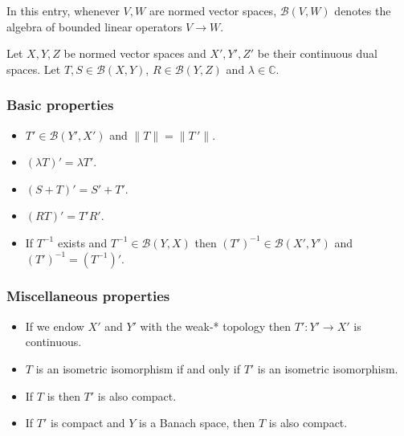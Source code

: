 \documentclass[12pt]{article}
\begin{document}

In this entry, whenever $V,W$ are normed vector spaces, $\mathcal{B}(V,W)$ denotes the algebra of bounded linear operators $V \longrightarrow W$.

Let $X, Y, Z$ be normed vector spaces and $X', Y', Z'$ be their continuous dual spaces. Let $T, S \in \mathcal{B}(X,Y)$, 
$R \in \mathcal{B}(Y,Z)$ and $\lambda \in \mathbb{C}$.

\subsubsection{Basic properties}
\begin{itemize}
\item $T' \in \mathcal{B}(Y',X')$ and $\|T\|=\|T\,'\|$.
\item $(\lambda T)' = \lambda T'$.
\item $(S+T)' = S'+T'$.
\item $(RT)' = T'R'$.
\item If $T^{-1}$ exists and $T^{-1} \in \mathcal{B}(Y,X)$ then $(T')^{-1} \in \mathcal{B}(X',Y')$ and $(T')^{-1} = (T^{-1})'$.
\end{itemize}

\subsubsection{Miscellaneous properties}
\begin{itemize}
\item If we endow $X'$ and $Y'$ with the weak-* topology then $T':Y' \longrightarrow X'$ is continuous.
\item $T$ is an isometric isomorphism if and only if $T'$ is an isometric isomorphism.
\item If $T$ is  then $T'$ is also compact.
\item If $T'$ is compact and $Y$ is a Banach space, then $T$ is also compact.
\end{itemize}
\end{document}
